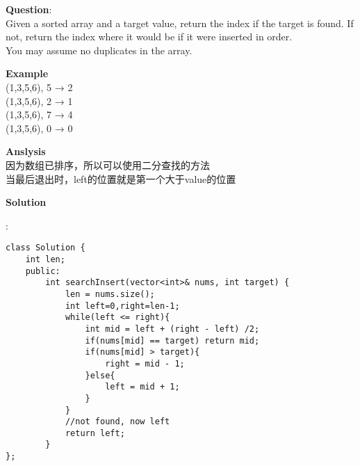 \begin{description}
    \item{\textbf{Question}}:\\%
		Given a sorted array and a target value, return the index if the target is found. If not, return the index where it would be if it were inserted in order.\\
		You may assume no duplicates in the array.\\

    \item{\textbf{Example}}\\
		(1,3,5,6), 5 → 2\\
		(1,3,5,6), 2 → 1\\
		(1,3,5,6), 7 → 4\\
		(1,3,5,6), 0 → 0\\

    \item{\textbf{Anslysis}}\\
		因为数组已排序，所以可以使用二分查找的方法\\
		当最后退出时，left的位置就是第一个大于value的位置\\

    \item{\textbf{Solution}}\\
	\item{} : \\
		\begin{lstlisting}
class Solution {
	int len;
	public:
		int searchInsert(vector<int>& nums, int target) {
			len = nums.size();
			int left=0,right=len-1;
			while(left <= right){
				int mid = left + (right - left) /2;
				if(nums[mid] == target)	return mid;
				if(nums[mid] > target){
					right = mid - 1;
				}else{
					left = mid + 1;
				}
			}
			//not found, now left 
			return left;
		}
};		
		\end{lstlisting}
\end{description}


